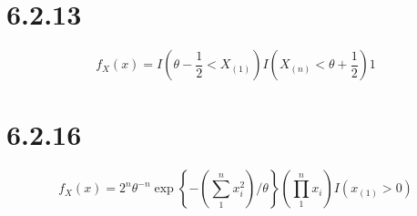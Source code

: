 \documentclass{article}
\begin{document}
\section{6.2.13}
\[
f_X(x) = I \left( \theta - \frac{1}{2} < X_{(1)} \right)
I\left(X_{(n)} < \theta + \frac{1}{2} \right)1
\]

\section{6.2.16}
\[
f_X(x) = 2^n\theta^{-n} \exp \left\{ - \left( \sum_1^n x_i^2 \right) /\theta \right\} \left( \prod_1^n x_i \right) I(x_{(1)} > 0)
\]
\end{document}
